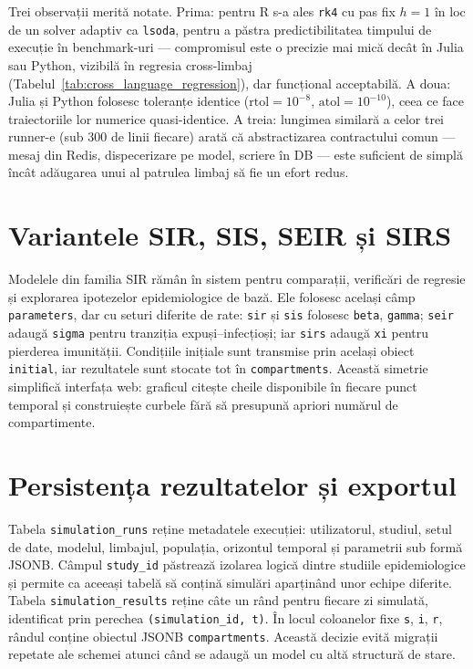 

Trei observații merită notate. Prima: pentru R s-a ales \texttt{rk4} cu pas fix
$h=1$ în loc de un solver adaptiv ca \texttt{lsoda}, pentru a păstra
predictibilitatea timpului de execuție în benchmark-uri --- compromisul este o
precizie mai mică decât în Julia sau Python, vizibilă în regresia cross-limbaj
(Tabelul~\ref{tab:cross_language_regression}), dar funcțional acceptabilă.
A doua: Julia și Python folosesc toleranțe identice ($\text{rtol}=10^{-8}$,
$\text{atol}=10^{-10}$), ceea ce face traiectoriile lor numerice quasi-identice.
A treia: lungimea similară a celor trei runner-e (sub $300$ de linii fiecare)
arată că abstractizarea contractului comun --- mesaj din Redis, dispecerizare pe
model, scriere în DB --- este suficient de simplă încât adăugarea unui al patrulea
limbaj să fie un efort redus.

\section{Variantele SIR, SIS, SEIR și SIRS}
\label{sec:sir_secundar}

Modelele din familia SIR rămân în sistem pentru comparații, verificări de
regresie și explorarea ipotezelor epidemiologice de bază. Ele folosesc același
câmp \texttt{parameters}, dar cu seturi diferite de rate:
\texttt{sir} și \texttt{sis} folosesc
\texttt{beta}, \texttt{gamma}; \texttt{seir} adaugă \texttt{sigma} pentru
tranziția expuși--infecțioși; iar \texttt{sirs} adaugă \texttt{xi} pentru
pierderea imunității. Condițiile inițiale sunt transmise prin același obiect
\texttt{initial}, iar rezultatele sunt stocate tot în \texttt{compartments}.
Această simetrie simplifică interfața web: graficul citește cheile disponibile
în fiecare punct temporal și construiește curbele fără să presupună apriori
numărul de compartimente.

\section{Persistența rezultatelor și exportul}
\label{sec:persistenta_rezultate}

Tabela \texttt{simulation\_runs} reține metadatele execuției: utilizatorul,
studiul, setul de date, modelul, limbajul, populația, orizontul temporal și
parametrii sub formă JSONB. Câmpul \texttt{study\_id} păstrează izolarea
logică dintre studiile epidemiologice și permite ca aceeași tabelă să conțină
simulări aparținând unor echipe diferite. Tabela \texttt{simulation\_results}
reține câte un rând pentru
fiecare zi simulată, identificat prin perechea \texttt{(simulation\_id, t)}.
În locul coloanelor fixe \texttt{s}, \texttt{i}, \texttt{r}, rândul conține
obiectul JSONB \texttt{compartments}. Această decizie evită migrații repetate
ale schemei atunci când se adaugă un model cu altă structură de stare.

